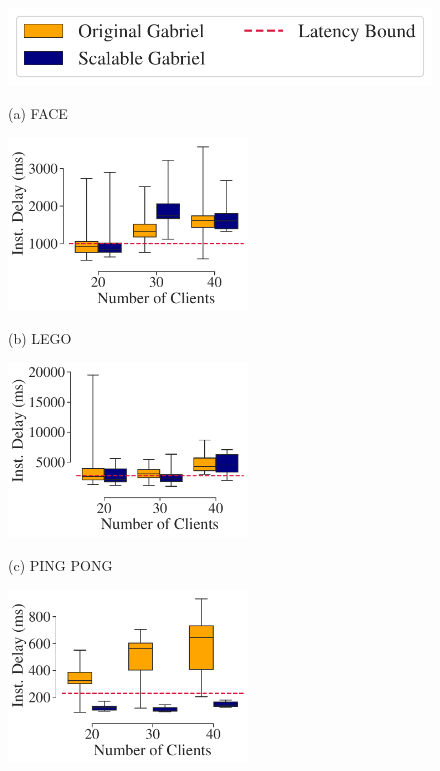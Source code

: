 \begin{figure}[]
\centering
\includegraphics[width=0.5\linewidth, trim=0em 0em 0em 0em, clip]{FIGS/fig-sec6-latency-legend.pdf} \\
\centering
\begin{turn}{90}{\hspace{0.6in}\small (a) FACE}\end{turn}\hspace{0.2in}\includegraphics[width=2.5in, trim=0em 0em 0em 0em, clip]{FIGS/fig-sec6-latency-face.pdf}
\begin{turn}{90}{\hspace{0.6in}\small (b)
LEGO}\end{turn}\hspace{0.2in}\includegraphics[width=2.5in, trim=0em 0em 0em 0em,
clip]{FIGS/fig-sec6-latency-lego.pdf}\\[0.08in]
  \vspace{0in}
\begin{turn}{90}{\hspace{0.6in}\small (c) PING PONG}\end{turn}\hspace{0.2in}\includegraphics[width=2.5in, trim=0em 0em 0em 0em, clip]{FIGS/fig-sec6-latency-pingpong.pdf}

\end{figure}
